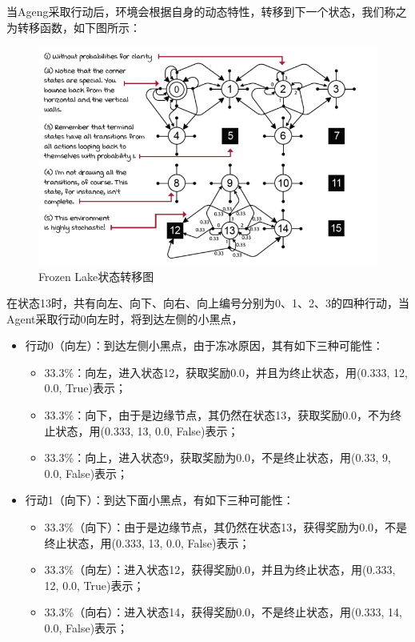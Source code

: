 当Ageng采取行动后，环境会根据自身的动态特性，转移到下一个状态，我们称之为转移函数，如下图所示：
\begin{figure}[H]
	\caption{Frozen Lake状态转移图}
	\label{p000008}
	\centering
	\includegraphics[width=15cm]{images/p000008}
\end{figure}
在状态13时，共有向左、向下、向右、向上编号分别为0、1、2、3的四种行动，当Agent采取行动0向左时，将到达左侧的小黑点，
\begin{itemize}
    \item 行动0（向左）：到达左侧小黑点，由于冻冰原因，其有如下三种可能性：
    \begin{itemize}
        \item 33.3\%：向左，进入状态12，获取奖励0.0，并且为终止状态，用(0.333, 12, 0.0, True)表示；
        \item 33.3\%：向下，由于是边缘节点，其仍然在状态13，获取奖励0.0，不为终止状态，用(0.333, 13, 0.0, False)表示；
        \item 33.3\%：向上，进入状态9，获取奖励为0.0，不是终止状态，用(0.33, 9, 0.0, False)表示；
    \end{itemize}
    \item 行动1（向下）：到达下面小黑点，有如下三种可能性：
    \begin{itemize}
        \item 33.3\%（向下）：由于是边缘节点，其仍然在状态13，获得奖励为0.0，不是终止状态，用(0.333, 13, 0.0, False)表示；
        \item 33.3\%（向左）：进入状态12，获得奖励0.0，并且为终止状态，用(0.333, 12, 0.0, True)表示；
        \item 33.3\%（向右）：进入状态14，获得奖励0.0，不是终止状态，用(0.333, 14, 0.0, False)表示；
    \end{itemize}
\end{itemize}
